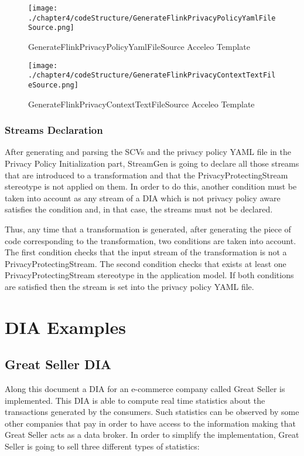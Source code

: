 \begin{figure}
\centering
{\texttt{[image: ./chapter4/codeStructure/GenerateFlinkPrivacyPolicyYamlFileSource.png]}}
\caption{GenerateFlinkPrivacyPolicyYamlFileSource Acceleo Template}
\label{fig:GenerateFlinkPrivacyPolicyYamlFileSource Acceleo Template}
\end{figure}

\begin{figure}
\centering
{\texttt{[image: ./chapter4/codeStructure/GenerateFlinkPrivacyContextTextFileSource.png]}}
\caption{GenerateFlinkPrivacyContextTextFileSource Acceleo Template}
\label{fig:GenerateFlinkPrivacyContextTextFileSource Acceleo Template}
\end{figure}

\subsubsection{Streams Declaration}

After generating and parsing the SCVs and the privacy policy YAML file in the Privacy Policy Initialization part, StreamGen is going to declare all those streams that are introduced to a transformation and that the PrivacyProtectingStream stereotype is not applied on them. In order to do this, another condition must be taken into account as any stream of a DIA which is not privacy policy aware satisfies the condition and, in that case, the streams must not be declared.

Thus, any time that a transformation is generated, after generating the piece of code corresponding to the transformation, two conditions are taken into account. The first condition checks that the input stream of the transformation is not a PrivacyProtectingStream. The second condition checks that exists at least one PrivacyProtectingStream stereotype in the application model. If both conditions are satisfied then the stream is set into the privacy policy YAML file.

\section{DIA Examples}

\subsection{Great Seller DIA}

Along this document a DIA for an e-commerce company called Great Seller is implemented. This DIA is able to compute real time statistics about the transactions generated by the consumers. Such statistics can be observed by some other companies that pay in order to have access to the information making that Great Seller acts as a data broker. In order to simplify the implementation, Great Seller is going to sell three different types of statistics:

